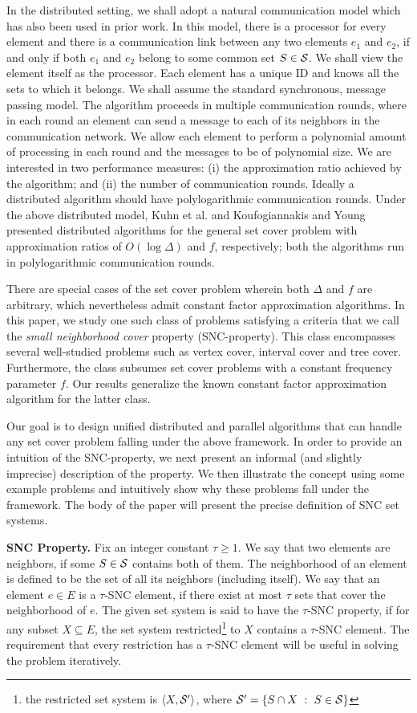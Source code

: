 \documentclass[11pt]{article}
\newcommand{\calS} {{\cal S}}
\newcommand{\pair}[2] {\langle #1, #2\rangle}
\begin{document}
In the distributed setting, we shall adopt a natural communication model which has also been used in prior work.
In this model, there is a processor for every element 
and there is a communication link between any two elements $e_1$ and $e_2$,
if and only if both $e_1$ and $e_2$ belong to some common set $S\in \calS$.
We shall view the element itself as the processor.
Each element has a unique ID and knows all the sets to which it belongs.
We shall assume the standard synchronous, message passing model.
The algorithm proceeds in multiple communication rounds, where in each round
an element can send a message to each of its neighbors in the communication network.
We allow each element to perform a polynomial amount of processing in each round
and the messages to be of polynomial size.
We are interested in two performance measures: 
(i) the approximation ratio achieved by the algorithm; and
(ii) the number of communication rounds. 
Ideally a distributed algorithm should have polylogarithmic communication rounds.
Under the above distributed model, Kuhn et al. \cite{near-sighted} and 
Koufogiannakis and Young \cite{Kouf-Young} presented distributed algorithms for the general set cover problem
with approximation ratios of $O(\log \Delta)$ and $f$, respectively;
both the algorithms run in polylogarithmic communication rounds.

There are special cases of the set cover problem wherein both $\Delta$ and $f$ are arbitrary,
which nevertheless admit constant factor approximation algorithms.
In this paper, we study one such class of problems satisfying a criteria that we call the  
{\em small neighborhood cover} property (SNC-property).
This class encompasses several well-studied problems such as 
vertex cover, interval cover and tree cover.
Furthermore, the class subsumes set cover problems with a constant frequency parameter $f$.
Our results generalize the known constant factor approximation algorithm for the latter class.

Our goal is to design unified distributed and parallel algorithms
that can handle any set cover problem falling under the above framework.
In order to provide an intuition of the SNC-property,
we next present an informal (and slightly imprecise) description of the property.
We then illustrate the concept using some example problems and intuitively show why these
problems fall under the framework.
The body of the paper will present the precise definition of SNC set systems. 

{\bf SNC Property.}
Fix an integer constant $\tau\geq 1$. We say that two elements are neighbors, if some $S\in \calS$
contains both of them. The neighborhood of an element is defined to be the set of all its neighbors (including itself).
We say that an element $e\in E$ is a $\tau$-SNC element,
if there exist at most $\tau$ sets that cover the neighborhood of $e$.
The given set system is said to have the $\tau$-SNC property, 
if for any subset $X\subseteq E$, the set system restricted\footnote{the restricted set system is $\pair{X}{\calS'}$, 
where $\calS'=\{S\cap X~:~S\in \calS\}$} to $X$ contains a $\tau$-SNC element.
The requirement that every restriction has a $\tau$-SNC element will be useful in solving the problem iteratively.
\end{document}
